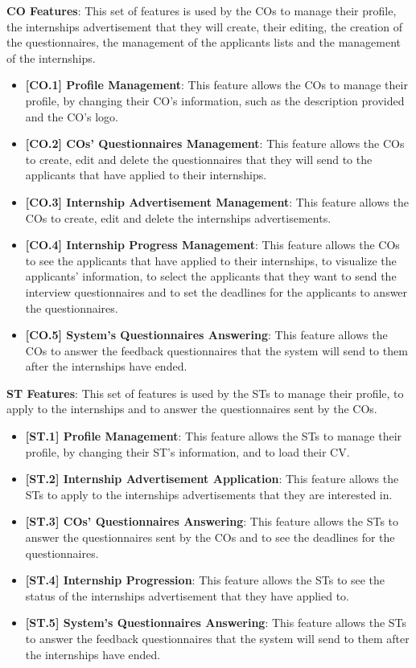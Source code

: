 \par \textbf{CO Features}: This set of features is used by the COs to manage their profile, the internships
advertisement that they will create, their editing, the creation of the questionnaires, the management of the applicants
lists and the management of the internships.

\begin{itemize}
    \item \textbf{[CO.1] Profile Management}: This feature allows the COs to manage their profile, by changing their
          CO's information, such as the description provided and the CO's logo.
    \item \textbf{[CO.2] COs' Questionnaires Management}: This feature allows the COs to create, edit and delete the
          questionnaires that they will send to the applicants that have applied to their internships.
    \item \textbf{[CO.3] Internship Advertisement Management}: This feature allows the COs to create, edit and delete
          the internships advertisements.
    \item \textbf{[CO.4] Internship Progress Management}: This feature allows the COs to see the applicants that have
          applied to their internships, to visualize the applicants' information, to select the applicants that they want to
          send the interview questionnaires and to set the deadlines for the applicants to answer the questionnaires.
    \item \textbf{[CO.5] System's Questionnaires Answering}: This feature allows the COs to answer the feedback
          questionnaires that the system will send to them after the internships have ended.
\end{itemize}

\par \textbf{ST Features}: This set of features is used by the STs to manage their profile, to apply to the 
internships and to answer the questionnaires sent by the COs.

\begin{itemize}
    \item \textbf{[ST.1] Profile Management}: This feature allows the STs to manage their profile, by changing their
          ST's information, and to load their CV.
    \item \textbf{[ST.2] Internship Advertisement Application}: This feature allows the STs to apply to the internships
          advertisements that they are interested in.
    \item \textbf{[ST.3] COs' Questionnaires Answering}: This feature allows the STs to answer the questionnaires sent by
          the COs and to see the deadlines for the questionnaires.
    \item \textbf{[ST.4] Internship Progression}: This feature allows the STs to see the status of the internships
          advertisement that they have applied to.
    \item \textbf{[ST.5] System's Questionnaires Answering}: This feature allows the STs to answer the feedback
          questionnaires that the system will send to them after the internships have ended.
\end{itemize}

